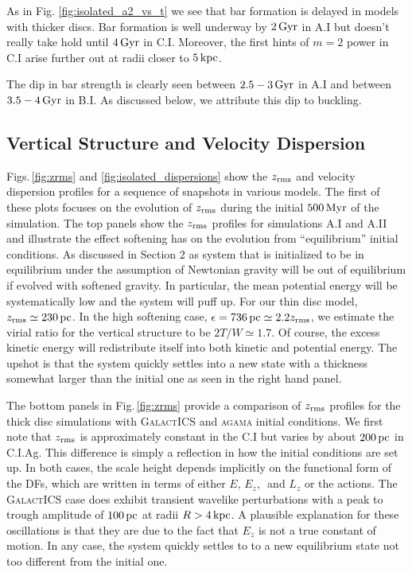 As in Fig. \ref{fig:isolated_a2_vs_t} we see that bar formation
is delayed in models with thicker discs.  Bar formation is 
well underway by $2\,{\rm Gyr}$ in A.I but doesn't really take hold
until $4\,{\rm Gyr}$ in C.I.  Moreover, the first hints of $m=2$ power
in C.I arise further out at radii closer to $5\,{\rm kpc}$.  

The dip in bar strength is clearly seen between $2.5-3\,{\rm Gyr}$ in
A.I and between $3.5-4\,{\rm Gyr}$ in B.I.  As discussed below, we
attribute this dip to buckling.

\subsection{Vertical Structure and Velocity Dispersion}

Figs.\,\ref{fig:zrms} and \ref{fig:isolated_dispersions} show the
$z_{\rm rms}$ and velocity dispersion profiles for a sequence of snapshots
in various models.  The first of these plots focuses on the evolution
of $z_{\rm rms}$ during the initial $500\,{\rm Myr}$ of the simulation.  The
top panels show the $z_{\rm rms}$ profiles for simulations A.I and A.II and
illustrate the effect softening has on the evolution from
``equilibrium'' initial conditions.  As discussed in Section 2 as
system that is initialized to be in equilibrium under the assumption
of Newtonian gravity will be out of equilibrium if evolved with
softened gravity.  In particular, the mean potential energy will be
systematically low and the system will puff up.  For our thin disc
model, $z_{\rm rms}\simeq 230\,{\rm pc}$.  In the high softening case,
$\epsilon = 736\,{\rm pc} \simeq 2.2z_{\rm rms}$, we estimate the virial ratio
for the vertical structure to be $2T/W\simeq 1.7$.  Of course, the
excess kinetic energy will redistribute itself into both kinetic and
potential energy.  The upshot is that the system quickly settles into
a new state with a thickness somewhat larger than the initial one as
seen in the right hand panel.

The bottom panels in Fig.\,\ref{fig:zrms} provide a comparison of
$z_{\rm rms}$ profiles for the thick disc simulations with
\textsc{GalactICS} and \textsc{agama} initial conditions.  We first
note that $z_{\rm rms}$ is approximately constant in the C.I but varies by
about $200\,{\rm pc}$ in C.I.Ag.  This difference is simply a
reflection in how the initial conditions are set up.  In both cases,
the scale height depends implicitly on the functional form of the DFs,
which are written in terms of either $E,\,E_z,\,$ and $L_z$ or the
actions.  The \textsc{GalactICS} case does exhibit transient wavelike
perturbations with a peak to trough amplitude of $100\,{\rm pc}$ at
radii $R>4\,{\rm kpc}$.  A plausible explanation for these
oscillations is that they are due to the fact that $E_z$ is not a true
constant of motion.  In any case, the system quickly settles to to a
new equilibrium state not too different from the initial one.

